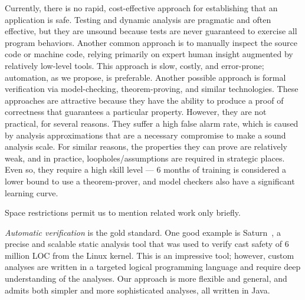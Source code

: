 \documentclass[preprint]{sig-alternate}
\begin{document}
% 
% 

Currently, there is no rapid, cost-effective approach for establishing that
an application is safe.  Testing and dynamic analysis are pragmatic and
often effective, but they are unsound because tests are never guaranteed
to exercise all program behaviors.
Another common approach is to manually inspect the source code
or machine code, relying primarily on expert human insight augmented by
relatively low-level tools.  This approach is slow, costly, and
error-prone; automation, as we propose, is preferable.  Another possible
approach is formal verification via model-checking, theorem-proving, and
similar technologies.  These approaches are attractive because they have
the ability to produce a proof of correctness that guarantees a particular
property.  However, they are not practical, for several reasons.  They
suffer a high false alarm rate, which is caused by analysis approximations
that are a necessary compromise to make a sound analysis scale.  For
similar reasons, the properties they can prove are relatively weak, and in
practice, loopholes/assumptions are required in strategic places.  Even so, they
require a high skill level --- 6 months of training is considered a lower
bound to use a theorem-prover, and model checkers also have a significant
learning curve.

Space restrictions permit us to mention related work only briefly.

\emph{Automatic verification} is the gold standard.  One good example is
Saturn~\cite{AikenBDDHH2007}, a precise and scalable static analysis
tool that was used to verify cast safety of 6 million LOC from the Linux
kernel.
This is an impressive tool; however, custom analyses are written in a
targeted logical programming language and require deep understanding
of the analyses.
Our approach is more flexible and general, and admits both simpler and more
sophisticated analyses, all written in Java.
\end{document}

